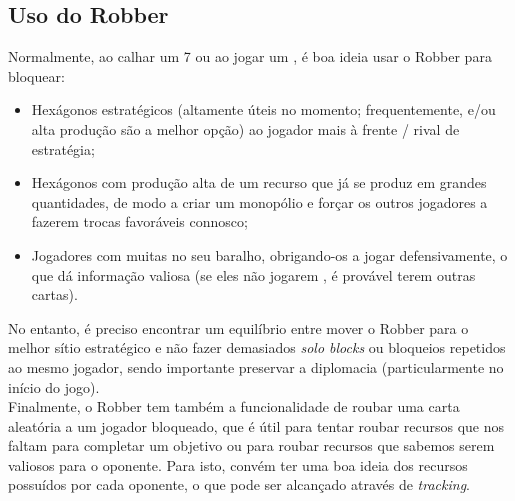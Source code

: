 \documentclass[12pt]{article}
\begin{document}
\subsection{Uso do Robber}
Normalmente, ao calhar um 7 ou ao jogar um , é boa ideia usar o Robber para bloquear:
\vspace{-0.6cm}
\begin{itemize}[noitemsep]
    \item Hexágonos estratégicos (altamente úteis no momento; frequentemente,  e/ou alta produção são a melhor opção) ao jogador mais à frente / rival de estratégia;
    \item Hexágonos com produção alta de um recurso que já se produz em grandes quantidades, de modo a criar um monopólio e forçar os outros jogadores a fazerem trocas favoráveis connosco;
    \item Jogadores com muitas  no seu baralho, obrigando-os a jogar  defensivamente, o que dá informação valiosa (se eles não jogarem , é provável terem outras cartas).
\end{itemize}
\vspace{-0.1cm}
No entanto, é preciso encontrar um equilíbrio entre mover o Robber para o melhor sítio estratégico e não fazer demasiados \textit{solo blocks} ou bloqueios repetidos ao mesmo jogador, sendo importante preservar a diplomacia (particularmente no início do jogo). \\
Finalmente, o Robber tem também a funcionalidade de roubar uma carta aleatória a um jogador bloqueado, que é útil para tentar roubar recursos que nos faltam para completar um objetivo ou para roubar recursos que sabemos serem valiosos para o oponente.
Para isto, convém ter uma boa ideia dos recursos possuídos por cada oponente, o que pode ser alcançado através de \textit{tracking}.
\end{document}
